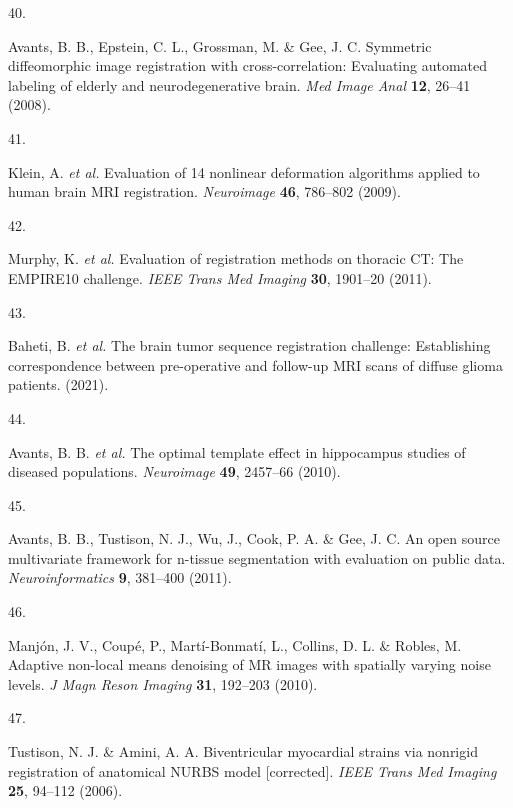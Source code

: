 \documentclass[
  12pt,
]{article}
\newlength{\cslhangindent}
\newlength{\csllabelwidth}
\newenvironment{CSLReferences}[2] %
 {%
  \setlength{\parindent}{0pt}
  \ifodd #1 \everypar{\setlength{\hangindent}{\cslhangindent}}\ignorespaces\fi
  \ifnum #2 > 0
  \setlength{\parskip}{#2\baselineskip}
  \fi
 }%
 {}
\newcommand{\CSLLeftMargin}[1]{\parbox[t]{\csllabelwidth}{#1}}
\newcommand{\CSLRightInline}[1]{\parbox[t]{\linewidth - \csllabelwidth}{#1}\break}
\begin{document}
\begin{CSLReferences}{0}{0}
\leavevmode{}%
\CSLLeftMargin{40. }
\CSLRightInline{Avants, B. B., Epstein, C. L., Grossman, M. \& Gee, J.
C. Symmetric diffeomorphic image registration with cross-correlation:
Evaluating automated labeling of elderly and neurodegenerative brain.
\emph{Med Image Anal} \textbf{12}, 26--41 (2008).}

\leavevmode{}%
\CSLLeftMargin{41. }
\CSLRightInline{Klein, A. \emph{et al.} Evaluation of 14 nonlinear
deformation algorithms applied to human brain {MRI} registration.
\emph{Neuroimage} \textbf{46}, 786--802 (2009).}

\leavevmode{}%
\CSLLeftMargin{42. }
\CSLRightInline{Murphy, K. \emph{et al.} Evaluation of registration
methods on thoracic {CT}: The {EMPIRE10} challenge. \emph{IEEE Trans Med
Imaging} \textbf{30}, 1901--20 (2011).}

\leavevmode{}%
\CSLLeftMargin{43. }
\CSLRightInline{Baheti, B. \emph{et al.} The brain tumor sequence
registration challenge: Establishing correspondence between
pre-operative and follow-up MRI scans of diffuse glioma patients.
(2021).}

\leavevmode{}%
\CSLLeftMargin{44. }
\CSLRightInline{Avants, B. B. \emph{et al.} The optimal template effect
in hippocampus studies of diseased populations. \emph{Neuroimage}
\textbf{49}, 2457--66 (2010).}

\leavevmode{}%
\CSLLeftMargin{45. }
\CSLRightInline{Avants, B. B., Tustison, N. J., Wu, J., Cook, P. A. \&
Gee, J. C. An open source multivariate framework for n-tissue
segmentation with evaluation on public data. \emph{Neuroinformatics}
\textbf{9}, 381--400 (2011).}

\leavevmode{}%
\CSLLeftMargin{46. }
\CSLRightInline{Manjón, J. V., Coupé, P., Martí-Bonmatí, L., Collins, D.
L. \& Robles, M. Adaptive non-local means denoising of {MR} images with
spatially varying noise levels. \emph{J Magn Reson Imaging} \textbf{31},
192--203 (2010).}

\leavevmode{}%
\CSLLeftMargin{47. }
\CSLRightInline{Tustison, N. J. \& Amini, A. A. Biventricular myocardial
strains via nonrigid registration of anatomical {NURBS} model
{[}corrected{]}. \emph{IEEE Trans Med Imaging} \textbf{25}, 94--112
(2006).}


\end{CSLReferences}
\end{document}
